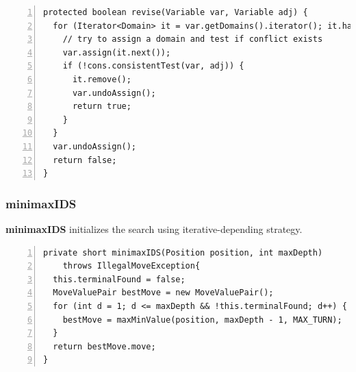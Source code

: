 \documentclass{article}
\begin{document}
\begin{lstlisting}[numbers=left]   
protected boolean revise(Variable var, Variable adj) {
  for (Iterator<Domain> it = var.getDomains().iterator(); it.hasNext(); ) {
    // try to assign a domain and test if conflict exists
    var.assign(it.next());
    if (!cons.consistentTest(var, adj)) {
      it.remove();
      var.undoAssign();
      return true;
    }
  }
  var.undoAssign();
  return false;
}
\end{lstlisting}



























































\subsubsection{minimaxIDS}

\textbf{minimaxIDS} initializes the search using iterative-depending strategy.


\begin{lstlisting}[numbers=left]
private short minimaxIDS(Position position, int maxDepth) 
    throws IllegalMoveException{
  this.terminalFound = false;
  MoveValuePair bestMove = new MoveValuePair();
  for (int d = 1; d <= maxDepth && !this.terminalFound; d++) {
    bestMove = maxMinValue(position, maxDepth - 1, MAX_TURN);
  }
  return bestMove.move;
}
\end{lstlisting}
\end{document}
